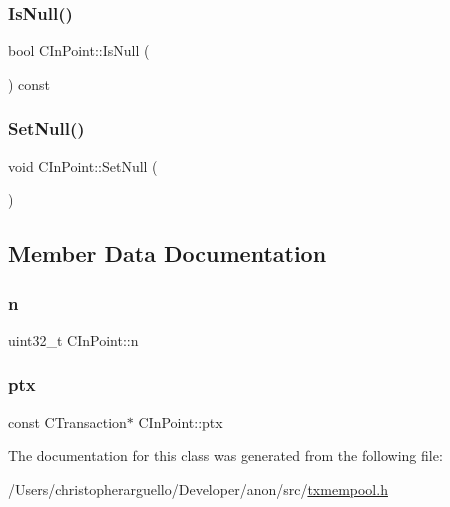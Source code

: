 \mbox{\label{class_c_in_point_a959a51348c217c82773bbedee016af76}} 
\subsubsection{\texorpdfstring{Is\+Null()}{IsNull()}}
{\footnotesize\ttfamily bool C\+In\+Point\+::\+Is\+Null (\begin{DoxyParamCaption}{ }\end{DoxyParamCaption}) const\hspace{0.3cm}{\ttfamily [inline]}}

\mbox{\label{class_c_in_point_af92945e76098bd920049f9f85a730e22}} 
\subsubsection{\texorpdfstring{Set\+Null()}{SetNull()}}
{\footnotesize\ttfamily void C\+In\+Point\+::\+Set\+Null (\begin{DoxyParamCaption}{ }\end{DoxyParamCaption})\hspace{0.3cm}{\ttfamily [inline]}}



\subsection{Member Data Documentation}
\mbox{\label{class_c_in_point_a456e18a182bfa70cbf63d28561c3ae1c}} 
\subsubsection{\texorpdfstring{n}{n}}
{\footnotesize\ttfamily uint32\+\_\+t C\+In\+Point\+::n}

\mbox{\label{class_c_in_point_a76bf1c9b14d4ba95ff3e260cd47a9ce4}} 
\subsubsection{\texorpdfstring{ptx}{ptx}}
{\footnotesize\ttfamily const C\+Transaction$\ast$ C\+In\+Point\+::ptx}



The documentation for this class was generated from the following file\+:\begin{DoxyCompactItemize}
\item 
/\+Users/christopherarguello/\+Developer/anon/src/\mbox{\hyperlink{txmempool_8h}{txmempool.\+h}}\end{DoxyCompactItemize}
